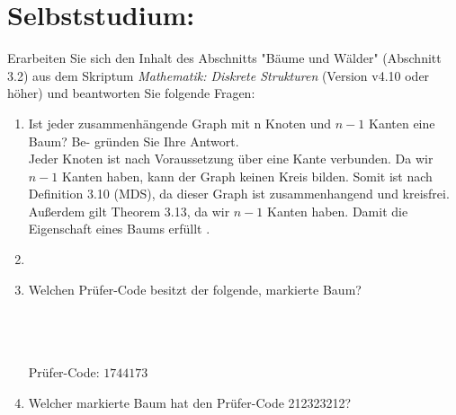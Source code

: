     \section*{Selbststudium:}
        Erarbeiten Sie sich den Inhalt des Abschnitts "Bäume und Wälder" (Abschnitt 3.2) aus dem
        Skriptum \textit{Mathematik: Diskrete Strukturen} (Version v4.10 oder höher) und beantworten Sie
        folgende Fragen:
    \begin{enumerate}[label=(\alph*)]
        \item Ist jeder zusammenhängende Graph mit n Knoten und $n - 1$ Kanten eine Baum? Be-
        gründen Sie Ihre Antwort.\\
        Jeder Knoten ist nach Voraussetzung über eine Kante verbunden. Da wir $n-1$ Kanten haben, 
        kann der Graph keinen Kreis bilden. Somit ist nach Definition 3.10 (MDS),
        da dieser Graph ist zusammenhangend und kreisfrei. %
        \\ Außerdem gilt Theorem 3.13, da wir $n-1$ Kanten haben. Damit die Eigenschaft eines Baums erfüllt .

        \item %

        \item Welchen Prüfer-Code besitzt der folgende, markierte Baum?\\\\
        \\\\
        Prüfer-Code: $1744173$

        \item Welcher markierte Baum hat den Prüfer-Code 212323212?\\\\
\end{enumerate}
